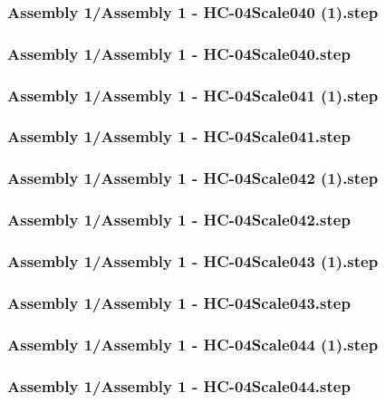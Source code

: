 \documentclass[a4paper,12pt]{article}
\begin{document}
\subsubsection{Assembly 1/Assembly 1 - HC-04Scale040 (1).step}

\subsubsection{Assembly 1/Assembly 1 - HC-04Scale040.step}

\subsubsection{Assembly 1/Assembly 1 - HC-04Scale041 (1).step}

\subsubsection{Assembly 1/Assembly 1 - HC-04Scale041.step}

\subsubsection{Assembly 1/Assembly 1 - HC-04Scale042 (1).step}

\subsubsection{Assembly 1/Assembly 1 - HC-04Scale042.step}

\subsubsection{Assembly 1/Assembly 1 - HC-04Scale043 (1).step}

\subsubsection{Assembly 1/Assembly 1 - HC-04Scale043.step}

\subsubsection{Assembly 1/Assembly 1 - HC-04Scale044 (1).step}

\subsubsection{Assembly 1/Assembly 1 - HC-04Scale044.step}

\end{document}
